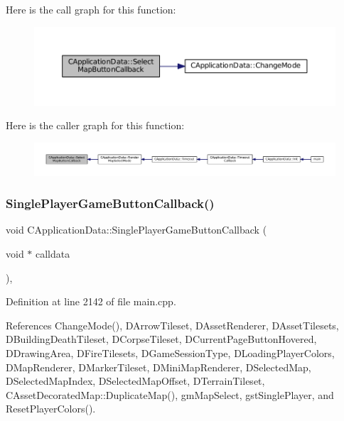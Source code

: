 Here is the call graph for this function\+:\nopagebreak
\begin{figure}[H]
\begin{center}
\leavevmode
\includegraphics[width=350pt]{classCApplicationData_a5f915dc03205b67ca79f4dcfd7b43f5a_cgraph}
\end{center}
\end{figure}
Here is the caller graph for this function\+:\nopagebreak
\begin{figure}[H]
\begin{center}
\leavevmode
\includegraphics[width=350pt]{classCApplicationData_a5f915dc03205b67ca79f4dcfd7b43f5a_icgraph}
\end{center}
\end{figure}
\hypertarget{classCApplicationData_a239a28599cbb6762c21306a4a03c6202}{}\label{classCApplicationData_a239a28599cbb6762c21306a4a03c6202} 
\subsubsection{\texorpdfstring{Single\+Player\+Game\+Button\+Callback()}{SinglePlayerGameButtonCallback()}}
{\footnotesize\ttfamily void C\+Application\+Data\+::\+Single\+Player\+Game\+Button\+Callback (\begin{DoxyParamCaption}\item[{void $\ast$}]{calldata }\end{DoxyParamCaption})\hspace{0.3cm}{\ttfamily [static]}, {\ttfamily [protected]}}



Definition at line 2142 of file main.\+cpp.



References Change\+Mode(), D\+Arrow\+Tileset, D\+Asset\+Renderer, D\+Asset\+Tilesets, D\+Building\+Death\+Tileset, D\+Corpse\+Tileset, D\+Current\+Page\+Button\+Hovered, D\+Drawing\+Area, D\+Fire\+Tilesets, D\+Game\+Session\+Type, D\+Loading\+Player\+Colors, D\+Map\+Renderer, D\+Marker\+Tileset, D\+Mini\+Map\+Renderer, D\+Selected\+Map, D\+Selected\+Map\+Index, D\+Selected\+Map\+Offset, D\+Terrain\+Tileset, C\+Asset\+Decorated\+Map\+::\+Duplicate\+Map(), gm\+Map\+Select, gst\+Single\+Player, and Reset\+Player\+Colors().



